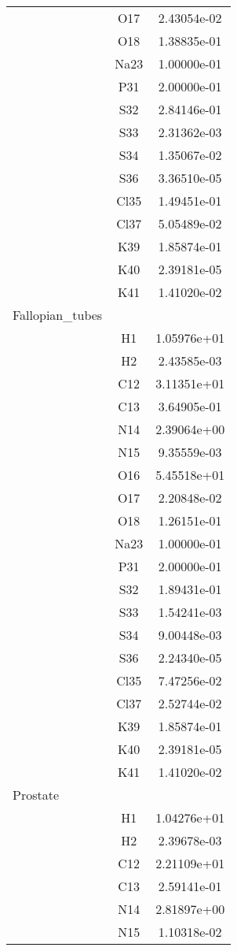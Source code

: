 \begin{centering}
\begin{longtable}{l c c}
& O17 & 2.43054e-02 \\ 
& O18 & 1.38835e-01 \\ 
& Na23 & 1.00000e-01 \\ 
& P31 & 2.00000e-01 \\ 
& S32 & 2.84146e-01 \\ 
& S33 & 2.31362e-03 \\ 
& S34 & 1.35067e-02 \\ 
& S36 & 3.36510e-05 \\ 
& Cl35 & 1.49451e-01 \\ 
& Cl37 & 5.05489e-02 \\ 
& K39 & 1.85874e-01 \\ 
& K40 & 2.39181e-05 \\ 
& K41 & 1.41020e-02 \\ 
\hline
Fallopian\_tubes & & \\
\hline
& H1 & 1.05976e+01 \\ 
& H2 & 2.43585e-03 \\ 
& C12 & 3.11351e+01 \\ 
& C13 & 3.64905e-01 \\ 
& N14 & 2.39064e+00 \\ 
& N15 & 9.35559e-03 \\ 
& O16 & 5.45518e+01 \\ 
& O17 & 2.20848e-02 \\ 
& O18 & 1.26151e-01 \\ 
& Na23 & 1.00000e-01 \\ 
& P31 & 2.00000e-01 \\ 
& S32 & 1.89431e-01 \\ 
& S33 & 1.54241e-03 \\ 
& S34 & 9.00448e-03 \\ 
& S36 & 2.24340e-05 \\ 
& Cl35 & 7.47256e-02 \\ 
& Cl37 & 2.52744e-02 \\ 
& K39 & 1.85874e-01 \\ 
& K40 & 2.39181e-05 \\ 
& K41 & 1.41020e-02 \\ 
\hline
Prostate & & \\
\hline
& H1 & 1.04276e+01 \\ 
& H2 & 2.39678e-03 \\ 
& C12 & 2.21109e+01 \\ 
& C13 & 2.59141e-01 \\ 
& N14 & 2.81897e+00 \\ 
& N15 & 1.10318e-02 \\ 

\end{longtable}
\end{centering}
